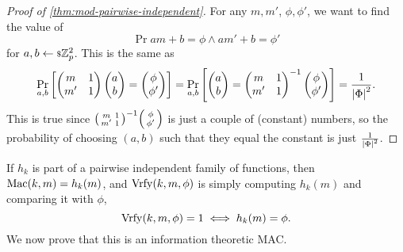 \begin{proof}[Proof of \cref{thm:mod-pairwise-independent}]
	For any $m, m'$, $\phi, \phi'$, we want to find the value of
	\begin{equation*}
		\Pr{a m + b = \phi \land a m' + b = \phi'}
	\end{equation*}
	for $a,b \rand{\Integers^2_p}$.
	This is the same as
	\begin{equation*}
		\Pr[a,b]{
			\begin{pmatrix}
				m & 1 \\
				m' & 1
			\end{pmatrix}
			\begin{pmatrix}
			a \\ b
			\end{pmatrix}
			=
			\begin{pmatrix}
			\phi \\ \phi'
			\end{pmatrix}
		}
		=
		\Pr[a,b]{
			\begin{pmatrix}
			a \\ b
			\end{pmatrix}
			=
			{
			\begin{pmatrix}
				m & 1 \\
				m' & 1
			\end{pmatrix}
			}^{-1}
			\begin{pmatrix}
			\phi \\ \phi'
			\end{pmatrix}
		}
		=
		\frac{1}{\abs{\GenericAuthSpace}^2}.
	\end{equation*}
	This is true since 
	${\begin{psmallmatrix}
		m & 1 \\
		m' & 1
	\end{psmallmatrix}
	}^{-1}
	\begin{psmallmatrix}
	\phi \\ \phi'
	\end{psmallmatrix}$
	is just a couple of (constant) numbers, so the probability of choosing $(a,b)$ such that they equal the constant is just $\frac{1}{\abs{\GenericAuthSpace}^2}$.
\end{proof}

If $h_k$ is part of a pairwise independent family of functions, then $\GenericMac(k,m) = h_k(m)$, and $\GenericVrfy(k,m,\phi)$ is simply computing $h_k(m)$ and comparing it with $\phi$, \ie
\begin{equation*}
	\GenericVrfy(k,m,\phi) = 1 \iff h_k(m) = \phi.
\end{equation*}
We now prove that this is an information theoretic \ac{MAC}.

